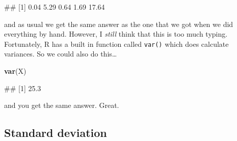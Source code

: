 \documentclass[
]{book}
\newenvironment{Shaded}{\begin{snugshade}}{\end{snugshade}}
\newcommand{\DecValTok}[1]{\textcolor[rgb]{0.00,0.00,0.81}{#1}}
\newcommand{\FunctionTok}[1]{\textcolor[rgb]{0.13,0.29,0.53}{\textbf{#1}}}
\newcommand{\NormalTok}[1]{#1}
\newcommand{\OtherTok}[1]{\textcolor[rgb]{0.56,0.35,0.01}{#1}}
\newcommand{\SpecialCharTok}[1]{\textcolor[rgb]{0.81,0.36,0.00}{\textbf{#1}}}
\begin{document}
\begin{Shaded}
\end{Shaded}

\begin{Shaded}
\begin{Highlighting}[]
\NormalTok{\#\# [1]  0.04  5.29  0.64  1.69 17.64}
\end{Highlighting}
\end{Shaded}

and as usual we get the same answer as the one that we got when we did everything by hand. However, I \emph{still} think that this is too much typing. Fortunately, R has a built in function called \texttt{var()} which does calculate variances. So we could also do this\ldots{}

\begin{Shaded}
\begin{Highlighting}[]
\FunctionTok{var}\NormalTok{(X)}
\end{Highlighting}
\end{Shaded}

\begin{Shaded}
\begin{Highlighting}[]
\NormalTok{\#\# [1] 25.3}
\end{Highlighting}
\end{Shaded}

and you get the same answer. Great.

\hypertarget{sd}{%
\subsection{Standard deviation}\label{sd}}
\end{document}
